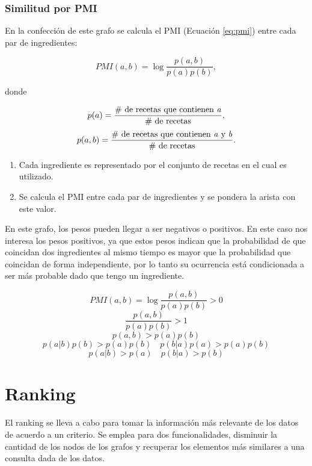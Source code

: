 \documentclass[
	a4paper, %
	10pt, %
	unnumberedsections, %
	twoside, %
]{LTJournalArticle}
\begin{document}
\subsubsection{Similitud por PMI}

En la confección de este grafo se calcula el PMI \autocite{teng2012recipe} (Ecuación \ref{eq:pmi}) entre cada par de ingredientes:

\begin{equation}
	PMI(a, b) = \log \frac{p(a,b)}{p(a)p(b)},
	\label{eq:pmi}
\end{equation}

donde

\begin{equation*}
	p(a) = \frac{\text{\# de recetas que contienen \textit{a}}}{\text{\# de recetas}},
\end{equation*}
\begin{equation*}
	p(a,b) = \frac{\text{\# de recetas que contienen \textit{a} y \textit{b}}}{\text{\# de recetas}}.
\end{equation*}

\begin{enumerate}
	\item Cada ingrediente es representado por el conjunto de recetas en el cual es utilizado.
	\item Se calcula el PMI entre cada par de ingredientes y se pondera la arista con este valor.
\end{enumerate}

En este grafo, los pesos pueden llegar a ser negativos o positivos. En este caso nos interesa los pesos positivos,
ya que estos pesos indican que la probabilidad de que coincidan dos ingredientes al mismo tiempo es mayor que la
probabilidad que coincidan de forma independiente, por lo tanto su ocurrencia está condicionada a ser más probable
dado que tengo un ingrediente.

$$
PMI(a,b) = \log \frac{p(a,b)}{p(a)p(b)} > 0
$$
$$
\frac{p(a,b)}{p(a)p(b)} > 1
$$
$$
p(a,b) > p(a)p(b)
$$
$$
p(a|b)p(b) > p(a)p(b) \quad p(b|a)p(a) > p(a)p(b)
$$
$$
p(a|b) > p(a) \quad p(b|a) > p(b)
$$

\section{Ranking}

El ranking se lleva a cabo para tomar la información más relevante de los datos de acuerdo a un criterio.
Se emplea para dos funcionalidades, disminuir la cantidad de los nodos de los grafos y recuperar los elementos
más similares a una consulta dada de los datos.
	
\end{document}
